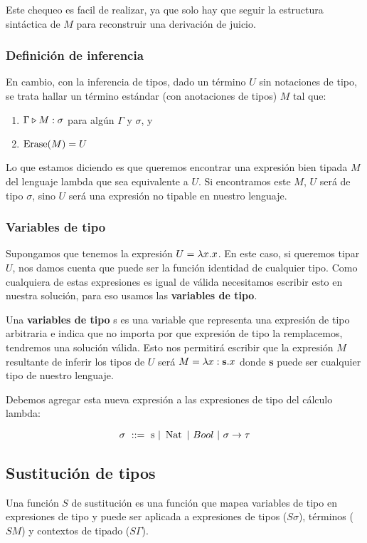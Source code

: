 Este chequeo  es facil de realizar, ya que solo hay que seguir la estructura sintáctica de $M$ para reconstruir una derivación de juicio. 

\subsubsection*{Definición de inferencia}
En cambio, con la inferencia de tipos, dado un término $U$ sin notaciones de tipo, se trata hallar un término estándar (con anotaciones de tipos) $M$ tal que:
\begin{enumerate}
\item $\Gamma\triangleright M : \sigma$ para algún $\Gamma$ y $\sigma$, y
\item $\operatorname{Erase}(M) = U$
\end{enumerate}

Lo que estamos diciendo es que queremos encontrar una expresión bien tipada $M$ del lenguaje lambda que sea equivalente a $U$. Si encontramos este $M$, $U$ será de tipo $\sigma$, sino $U$ será una expresión no tipable en nuestro lenguaje.


\subsubsection{Variables de tipo}
Supongamos que tenemos la expresión $U = \lambda x. x$. En este caso, si queremos tipar $U$, nos damos cuenta que puede ser la función identidad de cualquier tipo. Como cualquiera de estas expresiones es igual de válida necesitamos escribir esto en nuestra solución, para eso usamos las \textbf{variables de tipo}.

Una \textbf{variables de tipo} s es una variable que representa una expresión de tipo arbitraria e indica que no importa por que expresión de tipo la remplacemos, tendremos una solución válida. Esto nos permitirá escribir que la expresión $M$ resultante de inferir los tipos de $U$ será $M=\lambda x: \textbf{s} . x$ donde \textbf{s} puede ser cualquier tipo de nuestro lenguaje.

Debemos agregar esta nueva expresión a las expresiones  de tipo del cálculo lambda:

$$\sigma~::=~\text{s}~|~\operatorname{Nat}~|~Bool~|~\sigma\to\tau$$


\subsection{Sustitución de tipos}
Una función $S$ de sustitución es una función que mapea variables de tipo en expresiones de tipo y puede ser aplicada a expresiones de tipos ($S\sigma$), términos ($SM$) y contextos de tipado ($S\Gamma$).


